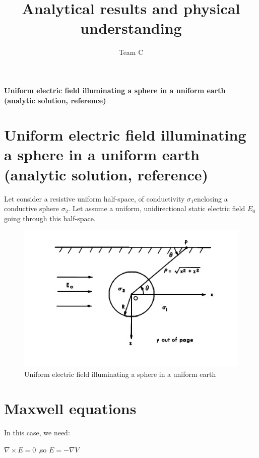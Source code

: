 \documentclass[11pt,letterpaper,leqno]{amsart}
\title{Analytical results and physical understanding}
\author{Team C}
\numberwithin{equation}{section}
\begin{document}
\maketitle
\thispagestyle{empty}



\Large
\textbf{Uniform electric field illuminating a sphere in a uniform earth (analytic solution, reference)}

\normalsize

\vspace{0.4cm}


\section{Uniform electric field illuminating a sphere in a uniform earth (analytic solution, reference)}



Let consider a  resistive uniform half-space, of conductivity $\sigma_1$enclosing a conductive sphere $\sigma_2$. Let assume a uniform, unidirectional static electric field $E_0$ going through this half-space.

\begin{figure}[h]
\caption{Uniform electric field illuminating a sphere in a uniform earth}
\includegraphics[scale=0.7]{electrostaticsphere.png}
\end{figure}

\section{Maxwell equations}

In this case, we need:

$\nabla \times E =0$ \quad,so \quad $E=-\nabla V$
\end{document}
